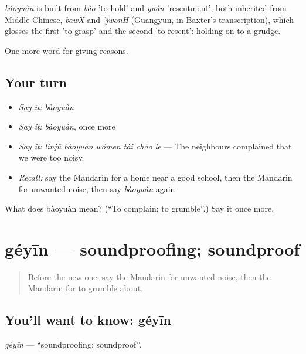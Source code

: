\begin{cousinweb}
\emph{bàoyuàn} is built from \emph{bào} 'to hold' and \emph{yuàn} 'resentment', both inherited from Middle Chinese, \emph{bawX} and \emph{'jwonH} (Guangyun, in Baxter's transcription), which glosses the first 'to grasp' and the second 'to resent': holding on to a grudge.
\end{cousinweb}

\begin{grammarlens}[title={What you've built}]
One more word for giving reasons.
\end{grammarlens}

\subsection*{Your turn}
\begin{itemize}
\raggedright
  \item \emph{Say it:} \emph{bàoyuàn}
  \item \emph{Say it:} \emph{bàoyuàn}, once more
  \item \emph{Say it:} \emph{línjū bàoyuàn wǒmen tài chǎo le} — The neighbours complained that we were too noisy.
  \item \emph{Recall:} say the Mandarin for a home near a good school, then the Mandarin for unwanted noise, then say \emph{bàoyuàn} again
\end{itemize}

\begin{tcolorbox}[breakable,colback=teal!4,colframe=teal!35!black,title={Before you move on}]
What does bàoyuàn mean? (\textquotedblleft{}To complain; to grumble\textquotedblright{}.) Say it once more.
\end{tcolorbox}
\section[géyīn]{géyīn — soundproofing; soundproof}

\label{lesson:ZH-C378-geyin}



\begin{quote}
Before the new one: say the Mandarin for unwanted noise, then the Mandarin for to grumble about.
\end{quote}

\subsection*{You'll want to know: géyīn}
\emph{géyīn} — \textquotedblleft{}soundproofing; soundproof\textquotedblright{}.

